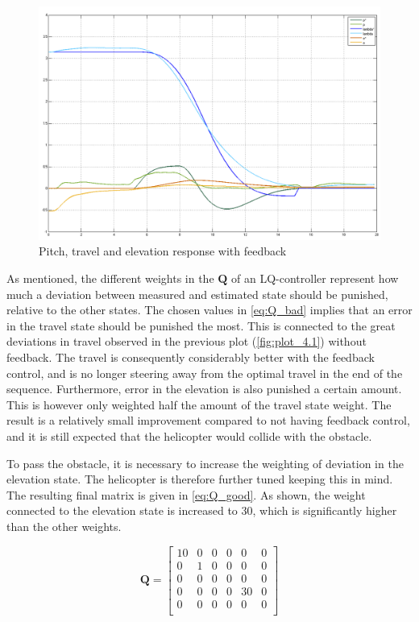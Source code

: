 \documentclass[a4paper, 12pt]{article}\usepackage[utf8]{inputenc}
\begin{document}
\begin{figure}[h!]
    \centering
    \includegraphics[width=150mm]{Part4/with_feedback_bad_tuning.PNG}
    \caption{Pitch, travel and elevation response with feedback}
    \label{fig:plot_4.2}
\end{figure}

As mentioned, the different weights in the $\boldsymbol{Q}$ of an LQ-controller represent how much a deviation between measured and estimated state should be punished, relative to the other states. The chosen values in \ref{eq:Q_bad} implies that an error in the travel state should be punished the most. This is connected to the great deviations in travel observed in the previous plot (\ref{fig:plot_4.1}) without feedback. The travel is consequently considerably better with the feedback control, and is no longer steering away from the optimal travel in the end of the sequence. Furthermore, error in the elevation is also punished a certain amount. This is however only weighted half the amount of the travel state weight. The result is a relatively small improvement compared to not having feedback control, and it is still expected that the helicopter would collide with the obstacle.

To pass the obstacle, it is necessary to increase the weighting of deviation in  the elevation state. The helicopter is therefore further tuned keeping this in mind. The resulting final  matrix is given in \ref{eq:Q_good}. As shown, the weight connected to the elevation state is increased to 30, which is significantly higher than the other weights. 

\begin{equation}
    \label{eq:Q_good}
    \boldsymbol{Q} = 
    \begin{bmatrix}
        10 & 0 & 0 & 0 & 0 & 0 \\
        0 & 1 & 0 & 0 & 0 & 0 \\
        0 & 0 & 0 & 0 & 0 & 0 \\
        0 & 0 & 0 & 0 & 30 & 0 \\
        0 & 0 & 0 & 0 & 0 & 0 \\
    \end{bmatrix}
\end{equation}
\end{document}
